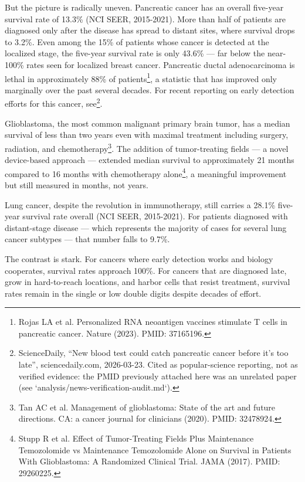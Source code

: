\documentclass[11pt,twoside,openright]{report}
\begin{document}
But the picture is radically uneven. Pancreatic cancer has an overall five-year survival rate of 13.3\% (NCI SEER, 2015-2021). More than half of patients are diagnosed only after the disease has spread to distant sites, where survival drops to 3.2\%. Even among the 15\% of patients whose cancer is detected at the localized stage, the five-year survival rate is only 43.6\% --- far below the near-100\% rates seen for localized breast cancer. Pancreatic ductal adenocarcinoma is lethal in approximately 88\% of patients\footnote{Rojas LA et al. Personalized RNA neoantigen vaccines stimulate T cells in pancreatic cancer. Nature (2023). PMID: 37165196.}, a statistic that has improved only marginally over the past several decades. For recent reporting on early detection efforts for this cancer, see\footnote{ScienceDaily, ``New blood test could catch pancreatic cancer before it's too late'', sciencedaily.com, 2026-03-23. Cited as popular-science reporting, not as verified evidence: the PMID previously attached here was an unrelated paper (see `analysis/news-verification-audit.md`).}.

Glioblastoma, the most common malignant primary brain tumor, has a median survival of less than two years even with maximal treatment including surgery, radiation, and chemotherapy\footnote{Tan AC et al. Management of glioblastoma: State of the art and future directions. CA: a cancer journal for clinicians (2020). PMID: 32478924.}. The addition of tumor-treating fields --- a novel device-based approach --- extended median survival to approximately 21 months compared to 16 months with chemotherapy alone\footnote{Stupp R et al. Effect of Tumor-Treating Fields Plus Maintenance Temozolomide vs Maintenance Temozolomide Alone on Survival in Patients With Glioblastoma: A Randomized Clinical Trial. JAMA (2017). PMID: 29260225.}, a meaningful improvement but still measured in months, not years.

Lung cancer, despite the revolution in immunotherapy, still carries a 28.1\% five-year survival rate overall (NCI SEER, 2015-2021). For patients diagnosed with distant-stage disease --- which represents the majority of cases for several lung cancer subtypes --- that number falls to 9.7\%.

The contrast is stark. For cancers where early detection works and biology cooperates, survival rates approach 100\%. For cancers that are diagnosed late, grow in hard-to-reach locations, and harbor cells that resist treatment, survival rates remain in the single or low double digits despite decades of effort.
\end{document}
